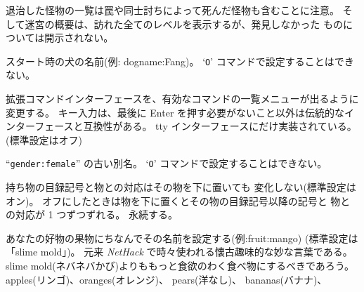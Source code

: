 退治した怪物の一覧は罠や同士討ちによって死んだ怪物も含むことに注意。
そして迷宮の概要は、訪れた全てのレベルを表示するが、発見しなかった
ものについては開示されない。
\item[\ib{dogname}]
スタート時の犬の名前(例: dogname:Fang)。
`{\tt O}' コマンドで設定することはできない。
\item[\ib{extmenu}]
拡張コマンドインターフェースを、有効なコマンドの一覧メニューが出るように変更する。
キー入力は、最後に Enter を押す必要がないこと以外は伝統的なインターフェースと互換性がある。
tty インターフェースにだけ実装されている。(標準設定はオフ)
\item[\ib{female}]
``{\tt gender:female}'' の古い別名。
`{\tt O}' コマンドで設定することはできない。
\item[\ib{fixinv}]
持ち物の目録記号と物との対応はその物を下に置いても
変化しない(標準設定はオン)。
オフにしたときは物を下に置くとその物の目録記号以降の記号と
物との対応が 1 つずつずれる。
永続する。
\item[\ib{fruit}]
あなたの好物の果物にちなんでその名前を設定する(例:fruit:mango)
(標準設定は「slime mold」)。
元来 {\it NetHack\/} で時々使われる懐古趣味的な妙な言葉である。
slime mold(ネバネバかび)よりももっと食欲のわく食べ物にするべきであろう。
apples(リンゴ)、oranges(オレンジ)、 pears(洋なし)、 bananas(バナナ)、
